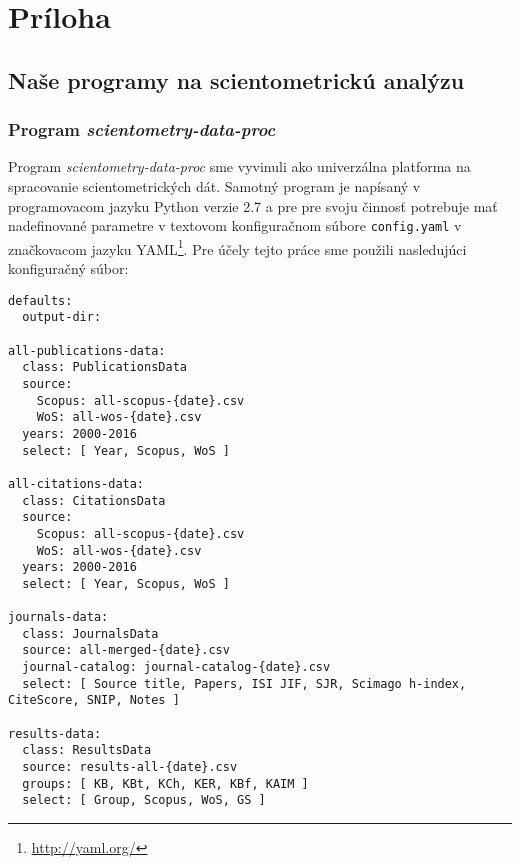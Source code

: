 \chapter*{Príloha}

\section*{Naše  programy na scientometrickú analýzu}


\subsection*{Program \emph{scientometry-data-proc}}

Program \emph{scientometry-data-proc} sme vyvinuli ako univerzálna platforma na
spracovanie scientometrických dát.  Samotný program je napísaný v programovacom
jazyku Python verzie 2.7 a pre pre svoju činnosť potrebuje mať nadefinované
parametre v textovom konfiguračnom súbore \verb|config.yaml| v značkovacom
jazyku YAML\footnote{\url{http://yaml.org/}}. Pre účely tejto práce sme použili
nasledujúci konfiguračný súbor:

\begin{source}
\begin{verbatim}
defaults:
  output-dir:

all-publications-data:
  class: PublicationsData
  source:
    Scopus: all-scopus-{date}.csv
    WoS: all-wos-{date}.csv
  years: 2000-2016
  select: [ Year, Scopus, WoS ]

all-citations-data:
  class: CitationsData
  source:
    Scopus: all-scopus-{date}.csv
    WoS: all-wos-{date}.csv
  years: 2000-2016
  select: [ Year, Scopus, WoS ]

journals-data:
  class: JournalsData
  source: all-merged-{date}.csv
  journal-catalog: journal-catalog-{date}.csv
  select: [ Source title, Papers, ISI JIF, SJR, Scimago h-index, CiteScore, SNIP, Notes ]

results-data:
  class: ResultsData
  source: results-all-{date}.csv
  groups: [ KB, KBt, KCh, KER, KBf, KAIM ]
  select: [ Group, Scopus, WoS, GS ]
\end{verbatim}
\end{source}

